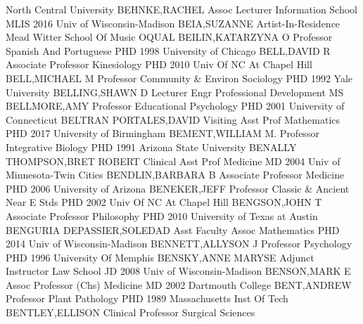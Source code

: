 \documentclass[
]{article}
\begin{document}
North Central University \textbar BEHNKE,RACHEL \textbar{} 
\textbar Assoc Lecturer \textbar Information School \textbar MLIS 2016
Univ of Wisconsin-Madison \textbar BEIA,SUZANNE \textbar{} 
\textbar Artist-In-Residence \textbar Mead Witter School Of Music
\textbar OQUAL \textbar BEILIN,KATARZYNA O \textbar{} 
\textbar Professor \textbar Spanish And Portuguese \textbar PHD 1998
University of Chicago \textbar BELL,DAVID R \textbar{} 
\textbar Associate Professor \textbar Kinesiology \textbar PHD 2010 Univ
Of NC At Chapel Hill \textbar BELL,MICHAEL M \textbar{} 
\textbar Professor \textbar Community \& Environ Sociology \textbar PHD
1992 Yale University \textbar BELLING,SHAWN D \textbar{} 
\textbar Lecturer \textbar Engr Professional Development \textbar MS
\textbar BELLMORE,AMY \textbar{}  \textbar Professor
\textbar Educational Psychology \textbar PHD 2001 University of
Connecticut \textbar BELTRAN PORTALES,DAVID \textbar{} 
\textbar Visiting Asst Prof \textbar Mathematics \textbar PHD 2017
University of Birmingham \textbar BEMENT,WILLIAM M. \textbar{}
 \textbar Professor \textbar Integrative Biology \textbar PHD
1991 Arizona State University \textbar BENALLY THOMPSON,BRET ROBERT
\textbar{}  \textbar Clinical Asst Prof \textbar Medicine
\textbar MD 2004 Univ of Minnesota-Twin Cities \textbar BENDLIN,BARBARA
B \textbar{}  \textbar Associate Professor \textbar Medicine
\textbar PHD 2006 University of Arizona \textbar BENEKER,JEFF \textbar{}
 \textbar Professor \textbar Classic \& Ancient Near E Stds
\textbar PHD 2002 Univ Of NC At Chapel Hill \textbar BENGSON,JOHN T
\textbar{}  \textbar Associate Professor \textbar Philosophy
\textbar PHD 2010 University of Texas at Austin \textbar BENGURIA
DEPASSIER,SOLEDAD \textbar{}  \textbar Asst Faculty Assoc
\textbar Mathematics \textbar PHD 2014 Univ of Wisconsin-Madison
\textbar BENNETT,ALLYSON J \textbar{}  \textbar Professor
\textbar Psychology \textbar PHD 1996 University Of Memphis
\textbar BENSKY,ANNE MARYSE \textbar{}  \textbar Adjunct
Instructor \textbar Law School \textbar JD 2008 Univ of
Wisconsin-Madison \textbar BENSON,MARK E \textbar{} 
\textbar Assoc Professor (Chs) \textbar Medicine \textbar MD 2002
Dartmouth College \textbar BENT,ANDREW \textbar{} 
\textbar Professor \textbar Plant Pathology \textbar PHD 1989
Massachusetts Inst Of Tech \textbar BENTLEY,ELLISON \textbar{}
 \textbar Clinical Professor \textbar Surgical Sciences
\end{document}
